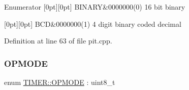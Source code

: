 \begin{DoxyEnumFields}{Enumerator}
[0pt][0pt]{}\mbox{\label{namespace_t_i_m_e_r_aa762d05daed3ea97420e855a5d03253da99f5fa2a10e384e9980cc7b9d2053094}} 
B\+I\+N\+A\+RY&0000\textquotesingle{}000(0) 16 bit binary \\
\hline

[0pt][0pt]{}\mbox{\label{namespace_t_i_m_e_r_aa762d05daed3ea97420e855a5d03253dac8b1953c3a3129fb92120b332014a43a}} 
B\+CD&0000\textquotesingle{}000(1) 4 digit binary coded decimal \\
\hline

\end{DoxyEnumFields}


Definition at line 63 of file pit.\+cpp.

\mbox{\label{namespace_t_i_m_e_r_a3231391ecc5f5895452fcc54c5fabe26}} 
\subsubsection{\texorpdfstring{O\+P\+M\+O\+DE}{OPMODE}}
{\footnotesize\ttfamily enum \hyperlink{namespace_t_i_m_e_r_a3231391ecc5f5895452fcc54c5fabe26}{T\+I\+M\+E\+R\+::\+O\+P\+M\+O\+DE} \+: uint8\+\_\+t}

